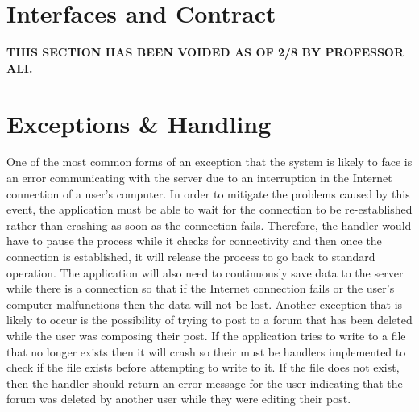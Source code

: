 \documentclass[12pt]{article}
\begin{document}
\section{Interfaces and Contract}
\textbf{THIS SECTION HAS BEEN VOIDED AS OF 2/8 BY PROFESSOR ALI.}
\section{Exceptions \& Handling} 
   One of the most common forms of an exception that the system is likely to face is an error communicating with the server due to an interruption in the Internet connection of a user's computer. In order to mitigate the problems caused by this event, the application must be able to wait for the connection to be re-established rather than crashing as soon as the connection fails. Therefore, the handler would have to pause the process while it checks for connectivity and then once the connection is established, it will release the process to go back to standard operation. The application will also need to continuously save data to the server while there is a connection so that if the Internet connection fails or the user's computer malfunctions then the data will not be lost.
   Another exception that is likely to occur is the possibility of trying to post to a forum that has been deleted while the user was composing their post. If the application tries to write to a file that no longer exists then it will crash so their must be handlers implemented to check if the file exists before attempting to write to it. If the file does not exist, then the handler should return an error message for the user indicating that the forum was deleted by another user while they were editing their post.
 
\end{document}

